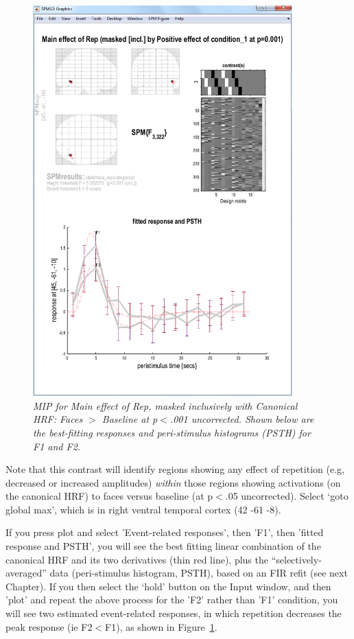\begin{figure}
\begin{center}
\includegraphics[width=100mm]{faces/cat3_psth}
\caption{\em MIP for Main effect of Rep, masked inclusively with Canonical HRF: Faces  $>$ Baseline at p$<$.001 uncorrected. Shown below are the best-fitting responses and peri-stimulus histograms (PSTH) for F1 and F2. \label{cat3_psth} } 
\end{center}
\end{figure}

Note that this contrast will identify regions showing any effect of repetition (e.g, decreased or increased amplitudes) {\em within} those regions showing activations (on the canonical HRF) to faces versus baseline (at p$<$.05 uncorrected). Select `goto global max', which is in right ventral temporal cortex (42 -61 -8).

If you press plot and select 'Event-related responses', then 'F1', then 'fitted response and PSTH', you will see the best fitting linear combination of the canonical HRF and its two derivatives (thin red line), plus the ``selectively-averaged'' data (peri-stimulus histogram, PSTH), based on an FIR refit (see next Chapter). 
If you then select the `hold' button on the Input window, and then 'plot' and repeat the above process for the 'F2' rather than 'F1' condition, you will see two estimated event-related responses, in which repetition decreases the peak response (ie F2$<$F1), as shown in Figure~\ref{cat3_psth}.

